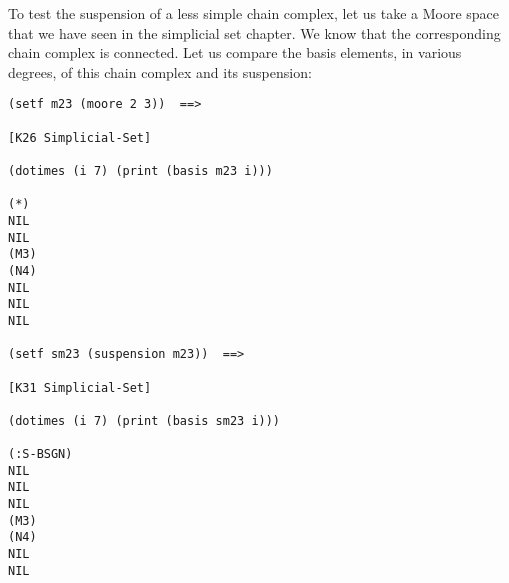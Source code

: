 To test the suspension of a less simple chain complex, let us take a Moore space that we have seen in the 
simplicial set chapter.
We know that the corresponding  chain complex  is connected. Let us compare the
basis elements, in various degrees, of this chain complex and its suspension:
{\footnotesize\begin{verbatim}
(setf m23 (moore 2 3))  ==>

[K26 Simplicial-Set]

(dotimes (i 7) (print (basis m23 i)))

(*) 
NIL 
NIL 
(M3) 
(N4) 
NIL 
NIL 
NIL

(setf sm23 (suspension m23))  ==>

[K31 Simplicial-Set]

(dotimes (i 7) (print (basis sm23 i)))

(:S-BSGN) 
NIL 
NIL 
NIL 
(M3) 
(N4) 
NIL 
NIL
\end{verbatim}}

